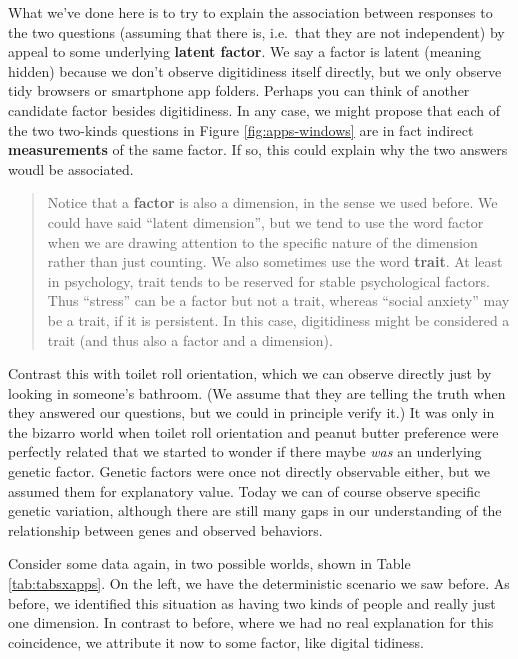 \documentclass[]{book}
\begin{document}
What we've done here is to try to explain the association between responses to the two questions (assuming that there is, i.e.~that they are not independent) by appeal to some underlying \textbf{latent factor}. We say a factor is latent (meaning hidden) because we don't observe digitidiness itself directly, but we only observe tidy browsers or smartphone app folders. Perhaps you can think of another candidate factor besides digitidiness. In any case, we might propose that each of the two two-kinds questions in Figure \ref{fig:apps-windows} are in fact indirect \textbf{measurements} of the same factor. If so, this could explain why the two answers woudl be associated.

\begin{quote}
Notice that a \textbf{factor} is also a dimension, in the sense we used before. We could have said ``latent dimension'', but we tend to use the word factor when we are drawing attention to the specific nature of the dimension rather than just counting. We also sometimes use the word \textbf{trait}. At least in psychology, trait tends to be reserved for stable psychological factors. Thus ``stress'' can be a factor but not a trait, whereas ``social anxiety'' may be a trait, if it is persistent. In this case, digitidiness might be considered a trait (and thus also a factor and a dimension).
\end{quote}

Contrast this with toilet roll orientation, which we can observe directly just by looking in someone's bathroom. (We assume that they are telling the truth when they answered our questions, but we could in principle verify it.) It was only in the bizarro world when toilet roll orientation and peanut butter preference were perfectly related that we started to wonder if there maybe \emph{was} an underlying genetic factor. Genetic factors were once not directly observable either, but we assumed them for explanatory value. Today we can of course observe specific genetic variation, although there are still many gaps in our understanding of the relationship between genes and observed behaviors.

Consider some data again, in two possible worlds, shown in Table \ref{tab:tabsxapps}. On the left, we have the deterministic scenario we saw before. As before, we identified this situation as having two kinds of people and really just one dimension. In contrast to before, where we had no real explanation for this coincidence, we attribute it now to some factor, like digital tidiness.
\end{document}
